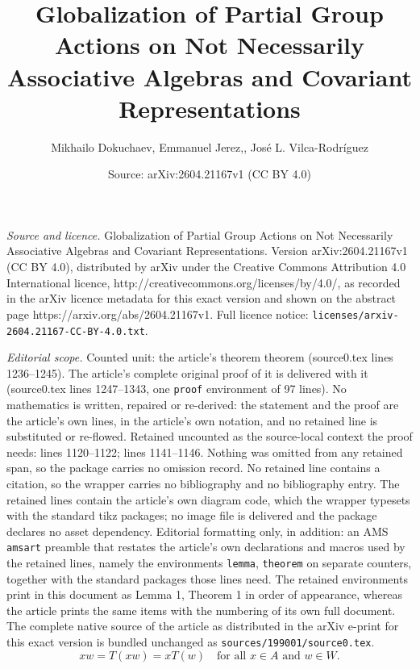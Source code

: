 \documentclass[10pt,a4paper]{amsart}
\title{Globalization of Partial Group Actions on Not Necessarily Associative Algebras and Covariant Representations}
\author{Mikhailo Dokuchaev, Emmanuel Jerez,, Jos\'e L. Vilca-Rodr\'iguez}
\date{Source: arXiv:2604.21167v1 (CC BY 4.0)}
\begin{document}
\maketitle

\noindent\emph{Source and licence.} Globalization of Partial Group Actions on Not Necessarily Associative Algebras and Covariant Representations. Version arXiv:2604.21167v1 (CC BY 4.0), distributed by arXiv under the Creative Commons Attribution 4.0 International licence, http://creativecommons.org/licenses/by/4.0/, as recorded in the arXiv licence metadata for this exact version and shown on the abstract page https://arxiv.org/abs/2604.21167v1. Full licence notice: \texttt{licenses/arxiv-2604.21167-CC-BY-4.0.txt}.\par\smallskip

\noindent\textit{Editorial scope.} Counted unit: the article's theorem theorem (source0.tex lines 1236--1245). The article's complete original proof of it is delivered with it (source0.tex lines 1247--1343, one \texttt{proof} environment of 97 lines). No mathematics is written, repaired or re-derived: the statement and the proof are the article's own lines, in the article's own notation, and no retained line is substituted or re-flowed.  Retained uncounted as the source-local context the proof needs: lines 1120--1122; lines 1141--1146.  Nothing was omitted from any retained span, so the package carries no omission record.  No retained line contains a citation, so the wrapper carries no bibliography and no bibliography entry.  The retained lines contain the article's own diagram code, which the wrapper typesets with the standard tikz packages; no image file is delivered and the package declares no asset dependency.  Editorial formatting only, in addition: an AMS \texttt{amsart} preamble that restates the article's own declarations and macros used by the retained lines, namely the environments \texttt{lemma}, \texttt{theorem} on separate counters, together with the standard packages those lines need.  The retained environments print in this document as Lemma 1, Theorem 1 in order of appearance, whereas the article prints the same items with the numbering of its own full document.  The complete native source of the article as distributed in the arXiv e-print for this exact version is bundled unchanged as \texttt{sources/199001/source0.tex}.
\begin{equation}\label{eq xw}
    xw = T(xw) = xT(w) \quad \text{for all } x \in A \text{ and } w \in W.
\end{equation}
\end{document}
